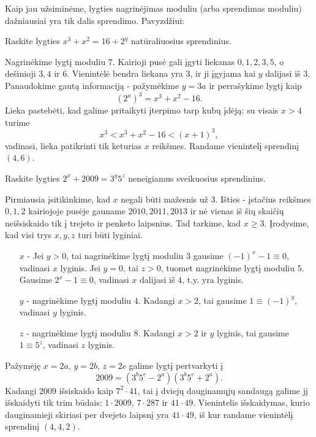 Kaip jau užsiminėme, lygties nagrinėjimas moduliu (arba sprendimas moduliu)
dažniausiai yra tik dalis sprendimo. Pavyzdžiui:

\begin{pav}
   Raskite lygties $x^3 + x^2 =
  16 + 2^y$ natūraliuosius sprendinius.
\end{pav}

\begin{sprendimas}
  Nagrinėkime lygtį moduliu $7$. Kairioji pusė gali įgyti liekanas $0, 1,
  2, 3, 5$, o dešinioji $3, 4$ ir $6$. Vienintėlė bendra liekana yra $3$, ir
  ji įgyjama kai $y$ dalijasi iš $3$. Panaudokime gautą informaciją -
  pažymėkime $y=3a$ ir perrašykime lygtį kaip $$(2^{a})^3 = x^3 + x^2 -
  16.$$ Lieka pastebėti, kad galime pritaikyti įterpimo tarp kubų įdėją: su
  visais $x>4$ turime $$x^3 < x^3 + x^2 -16 < (x+1)^3,$$ vadinasi, lieka
  patikrinti tik keturias $x$ reikšmes. Randame vienintelį sprendinį
  $(4,6)$.
\end{sprendimas}

\begin{pav}
   Raskite lygties $2^x + 2009 =
  3^y5^z$ neneigiamus sveikuosius sprendinius.
\end{pav} 
 
\begin{sprendimas}
  Pirmiausia įsitikinkime, kad $x$ negali būti mažesnis už $3$. Išties -
  įstačius reikšmes $0, 1, 2$ kairiojoje pusėje gauname $2010, 2011,
  2013$ ir nė vienas iš šių skaičių neišsiskaido tik į trejeto ir penketo
  laipsnius. Tad tarkime, kad $x\geq 3$. Įrodysime, kad visi trys
  $x, y, z$ turi būti lyginiai.
  \begin{itemize}
    \item[$x$ -] Jei $y>0$, tai nagrinėkime lygtį moduliu $3$ gausime
      $(-1)^x - 1 \equiv 0$, vadinasi $x$ lyginis. Jei $y=0$, tai
      $z>0$, tuomet nagrinėkime lygtį moduliu $5$. Gausime $2^x - 1 \equiv
      0$, vadinasi $x$ dalijasi iš $4$, t.y. yra lyginis.
    \item[$y$ -] nagrinėkime lygtį moduliu $4$. Kadangi $x>2$, tai gausime
      $1 \equiv (-1)^y$, vadinasi $y$ lyginis.
    \item[$z$ -] nagrinėkime lygtį moduliu $8$. Kadangi $x>2$ ir $y$ lyginis,
      tai gausime $1 \equiv 5^z$, vadinasi $z$ lyginis.
  \end{itemize}
  Pažymėję $x=2a$, $y=2b$, $z=2c$ galime lygtį pertvarkyti į $$2009 =
  (3^b5^c - 2^a)(3^b5^c + 2^a).$$ Kadangi $2009$ išsiskaido kaip $7^2\cdot
  41$, tai į dviejų dauginamųjų sandaugą galime jį išskaidyti tik trim
  būdais: $1\cdot 2009$, $7\cdot 287$ ir $41\cdot 49$. Vienintelis
  išskaidymas, kurio dauginamieji skiriasi per dvejeto laipsnį yra
  $41\cdot 49$, iš kur randame vienintėlį sprendinį $(4,4,2)$. 
\end{sprendimas}


